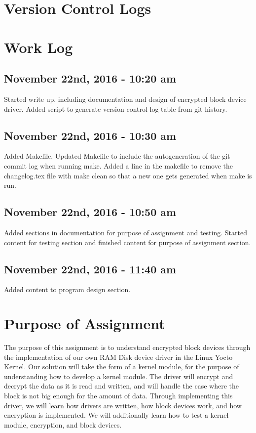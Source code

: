 \documentclass[letterpaper,10pt]{article}
\begin{document}
\section{Version Control Logs}


\section{Work Log}
\subsection{November 22nd, 2016 - 10:20 am}
Started write up, including documentation and design of encrypted block device driver. 
Added script to generate version control log table from git history.

\subsection{November 22nd, 2016 - 10:30 am}
Added Makefile. Updated Makefile to include the autogeneration of the git commit log when running make. 
Added a line in the makefile to remove the changelog.tex file with make clean so that a new one gets 
generated when make is run.

\subsection{November 22nd, 2016 - 10:50 am}
Added sections in documentation for purpose of assignment and testing. Started content for testing 
section and finished content for purpose of assignment section.

\subsection{November 22nd, 2016 - 11:40 am}
Added content to program design section.

\section{Purpose of Assignment}
The purpose of this assignment is to understand encrypted block devices through the implementation of 
our own RAM Disk device driver in the Linux Yocto Kernel. 
Our solution will take the form of a kernel module, for the purpose of understanding how to develop a 
kernel module. 
The driver will encrypt and decrypt the data as it is read and written, and will handle the case where 
the block is not big enough for the amount of data. 
Through implementing this driver, we will learn how drivers are written, how block devices work, and 
how encryption is implemented. 
We will additionally learn how to test a kernel module, encryption, and block devices.
\end{document}
